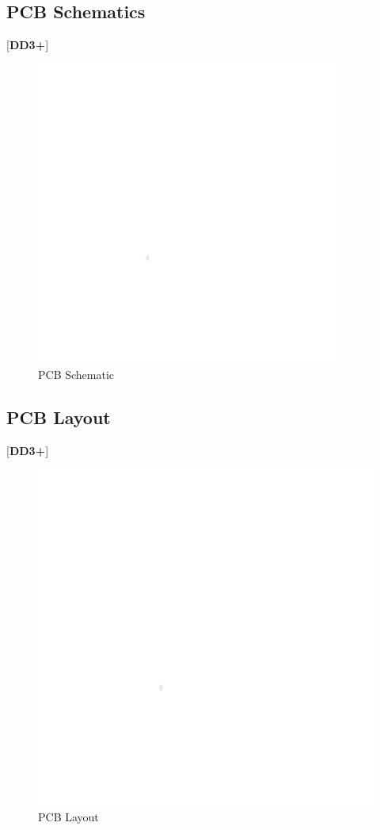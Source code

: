 \documentclass[letterpaper, 11pt]{article}
\begin{document}
\subsection{PCB Schematics}
[\textbf{DD3+}]
\begin{figure}[!h]
    \centering
    \includegraphics[width=10cm]{white.png} %
    \caption{PCB Schematic}
\end{figure}

\clearpage
\subsection{PCB Layout}
[\textbf{DD3+}]
\begin{figure}[h]
    \centering
    \includegraphics[width=16cm]{white.png} %
    \caption{PCB Layout}
\end{figure}
\end{document}
